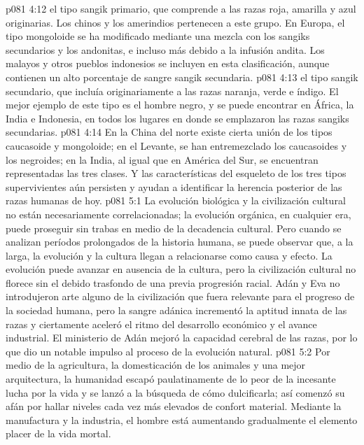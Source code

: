 \vs p081 4:12  el tipo sangik primario, que comprende a las razas roja, amarilla y azul originarias. Los chinos y los amerindios pertenecen a este grupo. En Europa, el tipo mongoloide se ha modificado mediante una mezcla con los sangiks secundarios y los andonitas, e incluso más debido a la infusión andita. Los malayos y otros pueblos indonesios se incluyen en esta clasificación, aunque contienen un alto porcentaje de sangre sangik secundaria.
\vs p081 4:13  el tipo sangik secundario, que incluía originariamente a las razas naranja, verde e índigo. El mejor ejemplo de este tipo es el hombre negro, y se puede encontrar en África, la India e Indonesia, en todos los lugares en donde se emplazaron las razas sangiks secundarias.
\vs p081 4:14 \pc En la China del norte existe cierta unión de los tipos caucasoide y mongoloide; en el Levante, se han entremezclado los caucasoides y los negroides; en la India, al igual que en América del Sur, se encuentran representadas las tres clases. Y las características del esqueleto de los tres tipos supervivientes aún persisten y ayudan a identificar la herencia posterior de las razas humanas de hoy.
\vs p081 5:1 La evolución biológica y la civilización cultural no están necesariamente correlacionadas; la evolución orgánica, en cualquier era, puede proseguir sin trabas en medio de la decadencia cultural. Pero cuando se analizan períodos prolongados de la historia humana, se puede observar que, a la larga, la evolución y la cultura llegan a relacionarse como causa y efecto. La evolución puede avanzar en ausencia de la cultura, pero la civilización cultural no florece sin el debido trasfondo de una previa progresión racial. Adán y Eva no introdujeron arte alguno de la civilización que fuera relevante para el progreso de la sociedad humana, pero la sangre adánica incrementó la aptitud innata de las razas y ciertamente aceleró el ritmo del desarrollo económico y el avance industrial. El ministerio de Adán mejoró la capacidad cerebral de las razas, por lo que dio un notable impulso al proceso de la evolución natural.
\vs p081 5:2 Por medio de la agricultura, la domesticación de los animales y una mejor arquitectura, la humanidad escapó paulatinamente de lo peor de la incesante lucha por la vida y se lanzó a la búsqueda de cómo dulcificarla; así comenzó su afán por hallar niveles cada vez más elevados de confort material. Mediante la manufactura y la industria, el hombre está aumentando gradualmente el elemento placer de la vida mortal.
